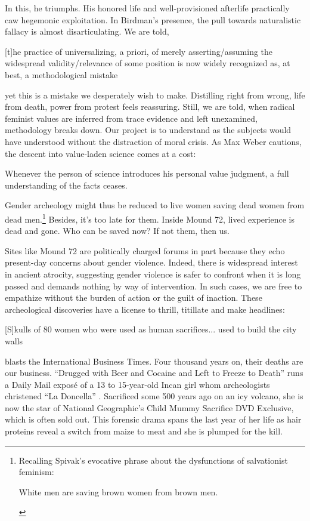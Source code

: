 In this, he triumphs. His honored life and well-provisioned afterlife practically caw hegemonic exploitation. In Birdman's presence, the pull towards naturalistic fallacy is almost disarticulating. We are told, \begin{IJSRAquote}{\cite[25]{lawson1999}}[t]he practice of universalizing, a priori, of merely asserting/assuming the widespread validity/relevance of some position is now widely recognized as, at best, a methodological mistake\end{IJSRAquote}yet this is a mistake we desperately wish to make. Distilling right from wrong, life from death, power from protest feels reassuring. Still, we are told, when radical feminist values are inferred from trace evidence and left unexamined, methodology breaks down. Our project is to understand as the subjects would have understood without the distraction of moral crisis. As Max Weber cautions, the descent into value-laden science comes at a cost: \begin{IJSRAquote}{\cite[146]{weber1946}}Whenever the person of science introduces his personal value judgment, a full understanding of the facts ceases.\end{IJSRAquote}Gender archeology might thus be reduced to live women saving dead women from dead men.\footnote{Recalling Spivak's evocative phrase about the dysfunctions of salvationist feminism: \begin{IJSRAquote}{\cite[48]{spivak2010}}White men are saving brown women from brown men.\end{IJSRAquote}} Besides, it's too late for them. Inside Mound 72, lived experience is dead and gone. Who can be saved now? If not them, then us.

Sites like Mound 72 are politically charged forums in part because they echo present-day concerns about gender violence. Indeed, there is widespread interest in ancient atrocity, suggesting gender violence is safer to confront when it is long passed and demands nothing by way of intervention. In such cases, we are free to empathize without the burden of action or the guilt of inaction. These archeological discoveries have a license to thrill, titillate and make headlines: \begin{IJSRAquote}{\cite[]{osborne2013}}[S]kulls of 80 women who were used as human sacrifices... used to build the city walls\end{IJSRAquote}blasts the International Business Times. Four thousand years on, their deaths are our business. \enquote{Drugged with Beer and Cocaine and Left to Freeze to Death} runs a Daily Mail exposé of a 13 to 15-year-old Incan girl whom archeologists christened \enquote{La Doncella} \parencite[]{macrae2013}. Sacrificed some 500 years ago on an icy volcano, she is now the star of National Geographic's Child Mummy Sacrifice DVD Exclusive, which is often sold out. This forensic drama spans the last year of her life as hair proteins reveal a switch from maize to meat and she is plumped for the kill. 

